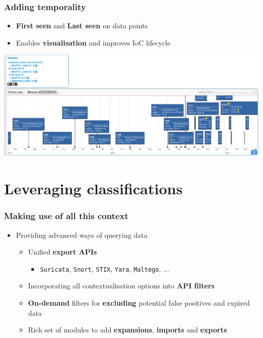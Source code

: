 \begin{frame}
    \frametitle{Adding temporality}
    \begin{itemize}
        \item {\bf First seen} and {\bf Last seen} on data points
        \item Enables {\bf visualisation} and improves IoC lifecycle 
    \end{itemize}
    \begin{center}
        \includegraphics[width=1.0\linewidth]{pics/timeline-misp-overview.png}
    \end{center}
\end{frame}

\section{Leveraging classifications}

\begin{frame}
  \frametitle{Making use of all this context}
  \begin{itemize}
    \item Providing advanced ways of querying data
    \begin{itemize}
      \item Unified {\bf export APIs}
      \begin{itemize}
        \item \texttt{Suricata}, \texttt{Snort}, \texttt{STIX}, \texttt{Yara}, \texttt{Maltego}, ...
      \end{itemize}
      \item Incorporating all contextualisation options into {\bf API filters}
      \item {\bf On-demand} filters for {\bf excluding} potential false positives and expired data
      \item Rich set of modules to add {\bf expansions}, {\bf imports} and {\bf exports}
    \end{itemize}
  \end{itemize}
\end{frame}

